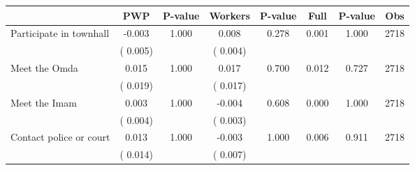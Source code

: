 
\begin{tabular}{l*{7}{c}}\hline&\multicolumn{1}{c}{PWP}&\multicolumn{1}{c}{P-value}&\multicolumn{1}{c}{Workers}&\multicolumn{1}{c}{P-value}&\multicolumn{1}{c}{Full}&\multicolumn{1}{c}{P-value}&\multicolumn{1}{c}{Obs} \\ \hline

 Participate in townhall       &             -0.003       &        1.000  &              0.008       &        0.278  &              0.001       &              1.000 &  2718 \\ 
                       &       (       0.005)             &                               &       (       0.004)                     &                               &                                               &                                &                      \\ 

 Meet the Omda       &              0.015       &        1.000  &              0.017       &        0.700  &              0.012       &              0.727 &  2718 \\ 
                       &       (       0.019)             &                               &       (       0.017)                     &                               &                                               &                                &                      \\ 

 Meet the Imam       &              0.003       &        1.000  &             -0.004       &        0.608  &              0.000       &              1.000 &  2718 \\ 
                       &       (       0.004)             &                               &       (       0.003)                     &                               &                                               &                                &                      \\ 

 Contact police or court       &              0.013       &        1.000  &             -0.003       &        1.000  &              0.006       &              0.911 &  2718 \\ 
                       &       (       0.014)             &                               &       (       0.007)                     &                               &                                               &                                &                      \\ 


\end{tabular}
